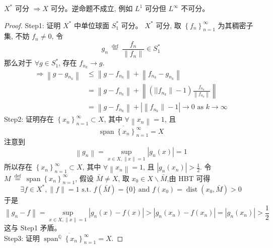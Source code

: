 \documentclass[lang=cn,newtx,10pt,scheme=chinese,thmcnt=chapter]{elegantbook}
\begin{document}
\begin{theorem}
$X^*$ 可分 $\Rightarrow X$ 可分。逆命题不成立, 例如 $L^1$ 可分但 $L^{\infty}$ 不可分。
\end{theorem}
\begin{proof}
Step1: 证明 $X^*$ 中单位球面 $S_1^*$ 可分。 $X^*$ 可分, 取 $\left\{f_n\right\}_{n=1}^{\infty}$ 为其稠密子集, 不妨 $f_n \neq 0$, 令
\begin{equation*}
g_n \stackrel{\text { def }}{=} \frac{f_n}{\left\|f_n\right\|} \in S_1^*
\end{equation*}
那么对于 $\forall g \in S_1^*$, 存在 $f_{n_k} \rightarrow g$.
\begin{equation*}
\begin{aligned}
\Rightarrow\left\|g-g_{n_k}\right\| & \leqslant\left\|g-f_{n_k}\right\|+\left\|f_{n_k}-g_{n_k}\right\| \\
& =\left\|g-f_{n_k}\right\|+\left\|\left(| | f_{n_k} \|-1\right) \frac{f_{n_k}}{\left\|f_{n_k}\right\|}\right\| \\
& =\left\|g-f_{n_k}\right\|+\left|\left\|f_{n_k} \|-1\right| \rightarrow 0 \text { as } k \rightarrow \infty\right.
\end{aligned}
\end{equation*}
Step2: 证明存在 $\left\{x_n\right\}_{n=1}^{\infty} \subset X$, 其中 $\forall\left\|x_n\right\|=1$, 且
\begin{equation*}
\overline{\operatorname{span}\left\{x_n\right\}_{n=1}^{\infty}}=X
\end{equation*}
注意到
\begin{equation*}
\left\|g_n\right\|=\sup _{x \in X,\|x\|=1}\left|g_n(x)\right|=1
\end{equation*}
所以存在 $\left\{x_n\right\}_{n=1}^{\infty} \subset X$, 其中 $\forall\left\|x_n\right\|=1$, 且 $\left|g_n\left(x_n\right)\right|>\frac{1}{2}$. 令 $M \stackrel{\text { def }}{=} \operatorname{span}\left\{x_n\right\}_{n=1}^{\infty}$, 假设 $\bar{M} \neq X$, 取 $x_0 \in X \backslash \bar{M}$,由 HBT 可得
\begin{equation*}
\exists f \in X^*,\|f\|=1 \text { s.t. } f(\bar{M})=\{0\} \text { and } f\left(x_0\right)=\operatorname{dist}\left(x_0, \bar{M}\right)>0
\end{equation*}
于是
\begin{equation*}
\left\|g_n-f\right\|=\sup _{x \in X,\|x\|=1}\left|g_n(x)-f(x)\right|>\left|g_n\left(x_n\right)-f\left(x_n\right)\right|=\left|g_n\left(x_n\right)\right|>\frac{1}{2}
\end{equation*}
这与 Step1 矛盾。\\
Step3: 证明 $\overline{\operatorname{span}^{ \mathbb{Q} }\left\{x_n\right\}_{n=1}^{\infty}}=X$.
\end{proof}
\end{document}
